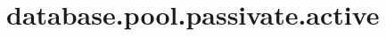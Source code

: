 \section{database.pool.passivate.active}
\label{configuration:DatabasePoolPassivateActive}
\AvailableInJavaOnly{\TODO}